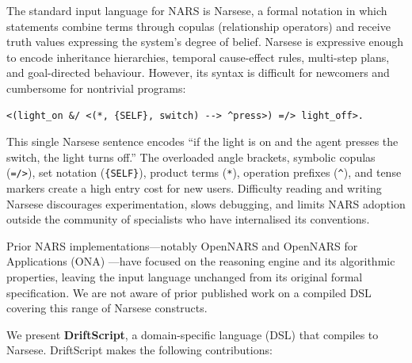 \documentclass[11pt,a4paper]{article}
\begin{document}
The standard input language for NARS is Narsese, a formal notation in which
statements combine terms through copulas (relationship operators) and receive
truth values expressing the system's degree of belief. Narsese is expressive
enough to encode inheritance hierarchies, temporal cause-effect rules,
multi-step plans, and goal-directed behaviour. However, its syntax is
difficult for newcomers and cumbersome for nontrivial programs:

\begin{lstlisting}[language={}]
<(light_on &/ <(*, {SELF}, switch) --> ^press>) =/> light_off>.
\end{lstlisting}

This single Narsese sentence encodes ``if the light is on and the agent
presses the switch, the light turns off.'' The overloaded angle brackets,
symbolic copulas (\texttt{=/>}), set notation (\texttt{\{SELF\}}), product
terms (\texttt{*}), operation prefixes (\texttt{\^{}}), and tense markers
create a high entry cost for new users. Difficulty reading and writing
Narsese discourages experimentation, slows debugging, and limits NARS
adoption outside the community of specialists who have internalised its
conventions.

Prior NARS implementations---notably OpenNARS \citep{wang1995non}
and OpenNARS for Applications (ONA) \citep{hammer2020opennars}---have focused
on the reasoning engine and its algorithmic properties, leaving the input
language unchanged from its original formal specification. We are not aware
of prior published work on a compiled DSL covering this range of Narsese
constructs.

We present \textbf{DriftScript}, a domain-specific language (DSL) that
compiles to Narsese. DriftScript makes the following contributions:
\end{document}
